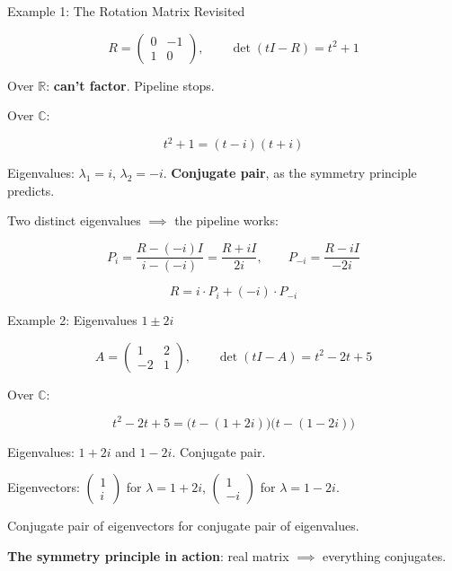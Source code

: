 \documentclass[10pt]{beamer}
\theoremstyle{definition}
\newcommand{\x}[1]{\alert{\textbf{#1}}}
\begin{document}
\begin{frame}[shrink=5]{Example 1: The Rotation Matrix Revisited}

$$R = \begin{pmatrix} 0 & -1 \\ 1 & 0 \end{pmatrix}, \qquad \det(tI - R) = t^2 + 1$$

\vfill

Over $\mathbb{R}$: \x{can't factor}. Pipeline stops.

\vfill\pause

Over $\mathbb{C}$:

$$t^2 + 1 = (t - i)(t + i)$$

Eigenvalues: $\lambda_1 = i$, $\lambda_2 = -i$. \quad \x{Conjugate pair}, as the symmetry principle predicts.

\vfill\pause

Two distinct eigenvalues $\implies$ the pipeline works:

$$P_i = \frac{R - (-i)I}{i - (-i)} = \frac{R + iI}{2i}, \qquad P_{-i} = \frac{R - iI}{-2i}$$

$$R = i \cdot P_i + (-i) \cdot P_{-i}$$

\end{frame}


\begin{frame}{Example 2: Eigenvalues $1 \pm 2i$}

$$A = \begin{pmatrix} 1 & 2 \\ -2 & 1 \end{pmatrix}, \qquad \det(tI - A) = t^2 - 2t + 5$$

\vfill

Over $\mathbb{C}$:

$$t^2 - 2t + 5 = \bigl(t - (1+2i)\bigr)\bigl(t - (1-2i)\bigr)$$

\vfill\pause

Eigenvalues: $1 + 2i$ and $1 - 2i$. \quad Conjugate pair.

\vfill

Eigenvectors: $\begin{pmatrix}1\\i\end{pmatrix}$ for $\lambda = 1+2i$, \quad $\begin{pmatrix}1\\-i\end{pmatrix}$ for $\lambda = 1-2i$.

\vfill

Conjugate pair of eigenvectors for conjugate pair of eigenvalues.

\vfill\pause

\x{The symmetry principle in action}: real matrix $\implies$ everything conjugates.

\end{frame}
\end{document}
